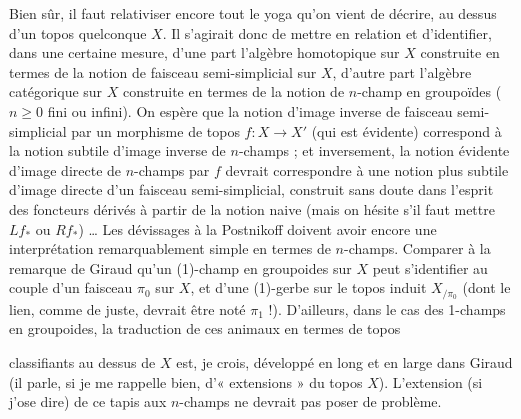 \documentclass[11pt,a4paper]{article}
\begin{document}
Bien sûr, il faut relativiser encore tout le yoga qu'on vient de décrire, au dessus d'un topos quelconque $X$. Il s'agirait donc de mettre en relation et d'identifier, dans une certaine mesure, d'une part l'algèbre homotopique sur $X$ construite en termes de la notion de faisceau semi-simplicial sur $X$, d'autre part l'algèbre catégorique sur $X$ construite en termes de la notion de $n$-champ en groupoïdes ($n \geqslant 0$ fini ou infini). On espère que la notion d'image inverse de faisceau semi-simplicial par un morphisme de topos $f\colon X \to X'$ (qui est évidente) correspond à la notion  subtile d'image inverse de $n$-champs ; et inversement, la notion évidente d'image directe de $n$-champs par $f$ devrait correspondre à une notion plus subtile d'image directe  d'un faisceau semi-simplicial, construit sans doute dans l'esprit des foncteurs dérivés à partir de la notion naive (mais on hésite s'il faut mettre $Lf_*$ ou $Rf_*$) … Les dévissages à la Postnikoff doivent avoir encore une interprétation remarquablement simple en termes de $n$-champs. Comparer à la remarque de Giraud qu'un (1)-champ en groupoides sur $X$ peut s'identifier au couple d'un faisceau $\pi_0$ sur $X$, et d'une (1)-gerbe sur le topos induit $X_{/\pi_0}$ (dont le lien, comme de juste, devrait être noté $\pi_1$ !). D'ailleurs, dans le cas des 1-champs en groupoides, la traduction de ces animaux en termes de topos

classifiants au dessus de $X$ est, je crois, développé en long et en large dans Giraud (il parle, si je me rappelle bien, d'« extensions » du topos $X$). L'extension (si j'ose dire) de ce tapis aux $n$-champs ne devrait pas poser de problème.
\end{document}
